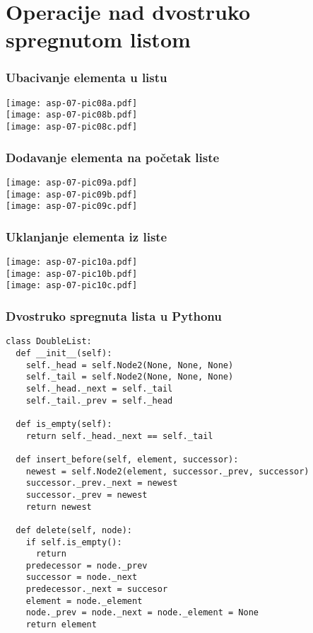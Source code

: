 \documentclass[compress]{beamer}
\begin{document}
\section[Operacije]{Operacije nad dvostruko spregnutom listom}
\begin{frame}[fragile]
  \frametitle{Ubacivanje elementa u listu}
  \begin{center}
    \texttt{[image: asp-07-pic08a.pdf]} \\
    \texttt{[image: asp-07-pic08b.pdf]} \\
    \texttt{[image: asp-07-pic08c.pdf]}
  \end{center}
\end{frame}

\begin{frame}[fragile]
  \frametitle{Dodavanje elementa na početak liste}
  \begin{center}
    \texttt{[image: asp-07-pic09a.pdf]} \\
    \texttt{[image: asp-07-pic09b.pdf]} \\
    \texttt{[image: asp-07-pic09c.pdf]}
  \end{center}
\end{frame}

\begin{frame}[fragile]
  \frametitle{Uklanjanje elementa iz liste}
  \begin{center}
    \texttt{[image: asp-07-pic10a.pdf]} \\
    \texttt{[image: asp-07-pic10b.pdf]} \\
    \texttt{[image: asp-07-pic10c.pdf]}
  \end{center}
\end{frame}

\begin{frame}
  \frametitle{Dvostruko spregnuta lista u Pythonu}
\begin{verbatim}
class DoubleList:
  def __init__(self):
    self._head = self.Node2(None, None, None)
    self._tail = self.Node2(None, None, None)
    self._head._next = self._tail
    self._tail._prev = self._head

  def is_empty(self):
    return self._head._next == self._tail
    
  def insert_before(self, element, successor):
    newest = self.Node2(element, successor._prev, successor)
    successor._prev._next = newest
    successor._prev = newest
    return newest
    
  def delete(self, node):
    if self.is_empty():
      return
    predecessor = node._prev
    successor = node._next
    predecessor._next = succesor
    element = node._element
    node._prev = node._next = node._element = None
    return element
\end{verbatim}
\end{frame}
\end{document}
